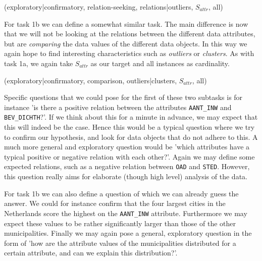 (exploratory|confirmatory, relation-seeking, relations|outliers, $S_{attr}$, all)

For task 1b we can define a somewhat similar task. The main difference is now that we will not be looking at the relations between the different data attributes, but are \textit{comparing} the data values of the different data objects. In this way we again hope to find interesting characteristics such as \textit{outliers} or \textit{clusters}. As with task 1a, we again take $S_{attr}$ as our target and all instances as cardinality.

(exploratory|confirmatory, comparison, outliers|clusters, $S_{attr}$, all)

Specific questions that we could pose for the first of these two subtasks is for instance 'is there a positive relation between the attributes \texttt{AANT\_INW} and \texttt{BEV\_DICHTH}?'. If we think about this for a minute in advance, we may expect that this will indeed be the case. Hence this would be a typical question where we try to confirm our hypothesis, and look for data objects that do not adhere to this. A much more general and exploratory question would be 'which attributes have a typical positive or negative relation with each other?'. Again we may define some expected relations, such as a negative relation between \texttt{OAD} and \texttt{STED}. However, this question really aims for elaborate (though high level) analysis of the data.

For task 1b we can also define a question of which we can already guess the answer. We could for instance confirm that the four largest cities in the Netherlands score the highest on the \texttt{AANT\_INW} attribute. Furthermore we may expect these values to be rather significantly larger than those of the other municipalities. Finally we may again pose a general, exploratory question in the form of 'how are the attribute values of the municipalities distributed for a certain attribute, and can we explain this distribution?'.





